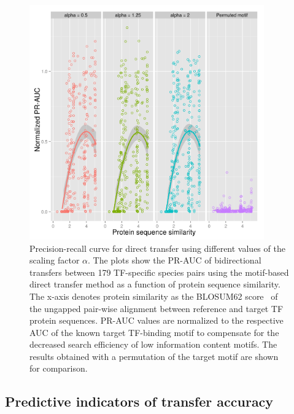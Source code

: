 \begin{figure}
  \centering
  \includegraphics[width=0.9\textwidth]{figures/chapter3/direct-transfer-alpha}
  \caption{Precision-recall curve for direct transfer using different values of
    the scaling factor $\alpha$. The plots show the PR-AUC of bidirectional
    transfers between 179 TF-specific species pairs using the motif-based
    direct transfer method as a function of protein sequence similarity. The
    x-axis denotes protein similarity as the BLOSUM62
    score~\cite{henikoff1992amino} of the ungapped pair-wise alignment between
    reference and target TF protein sequences. PR-AUC values are normalized to
    the respective AUC of the known target TF-binding motif to compensate for
    the decreased search efficiency of low information content motifs. The
    results obtained with a permutation of the target motif are shown for
    comparison.}
\label{fig:direct-transfer-alpha}
\end{figure}

\subsection{Predictive indicators of transfer accuracy}


